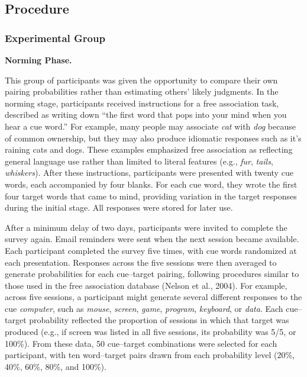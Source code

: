 \documentclass[
  man,floatsintext]{apa7}
\begin{document}
\subsection{Procedure}\label{procedure}

\subsubsection{Experimental Group}\label{experimental-group}

\textbf{Norming Phase.}

This group of participants was given the opportunity to compare their
own pairing probabilities rather than estimating others' likely
judgments. In the norming stage, participants received instructions for
a free association task, described as writing down ``the first word that
pops into your mind when you hear a cue word.'' For example, many people
may associate \emph{cat} with \emph{dog} because of common ownership, but they may
also produce idiomatic responses such as it's raining cats and dogs.
These examples emphasized free association as reflecting general
language use rather than limited to literal features (e.g., \emph{fur},
\emph{tails}, \emph{whiskers}). After these instructions, participants were
presented with twenty cue words, each accompanied by four blanks. For
each cue word, they wrote the first four target words that came to mind,
providing variation in the target responses during the initial stage.
All responses were stored for later use.

After a minimum delay of two days, participants were invited to complete
the survey again. Email reminders were sent when the next session became
available. Each participant completed the survey five times, with cue
words randomized at each presentation. Responses across the five
sessions were then averaged to generate probabilities for each
cue--target pairing, following procedures similar to those used in the
free association database (Nelson et al., 2004). For example, across five
sessions, a participant might generate several different responses to
the cue \emph{computer}, such as \emph{mouse}, \emph{screen}, \emph{game}, \emph{program},
\emph{keyboard}, or \emph{data}. Each cue--target probability reflected the
proportion of sessions in which that target was produced (e.g., if
screen was listed in all five sessions, its probability was 5/5, or
100\%). From these data, 50 cue--target combinations were selected for
each participant, with ten word--target pairs drawn from each probability
level (20\%, 40\%, 60\%, 80\%, and 100\%).
\end{document}
